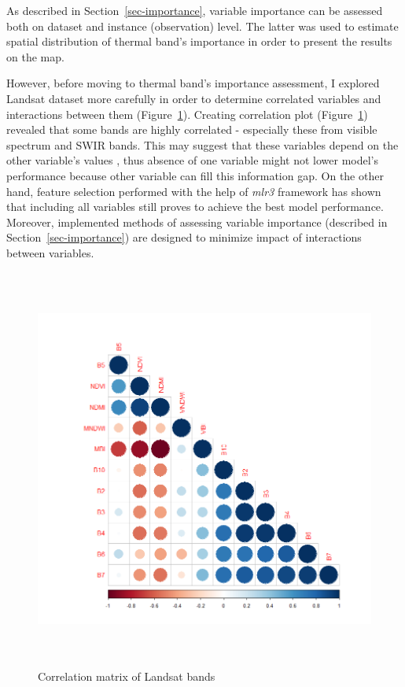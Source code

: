 \documentclass{amuthesis}
\begin{document}
As described in Section~\ref{sec-importance}, variable importance can be
assessed both on dataset and instance (observation) level. The latter
was used to estimate spatial distribution of thermal band's importance
in order to present the results on the map.

However, before moving to thermal band's importance assessment, I
explored Landsat dataset more carefully in order to determine correlated
variables and interactions between them (Figure~\ref{fig-rycina19}).
Creating correlation plot (Figure~\ref{fig-rycina19}) revealed that some
bands are highly correlated - especially these from visible spectrum and
SWIR bands. This may suggest that these variables depend on the other
variable's values \autocite{biecek_explanatory_2021}, thus absence of
one variable might not lower model's performance because other variable
can fill this information gap. On the other hand, feature selection
performed with the help of \emph{mlr3} framework \autocite{R-mlr3} has
shown that including all variables still proves to achieve the best
model performance. Moreover, implemented methods of assessing variable
importance (described in Section~\ref{sec-importance}) are designed to
minimize impact of interactions between variables.

\begin{figure}[H]

{\centering \includegraphics[width=5.57292in,height=5.20833in]{./figures/corrplot.png}

}

\caption{\label{fig-rycina19}Correlation matrix of Landsat bands}

\end{figure}
\end{document}

